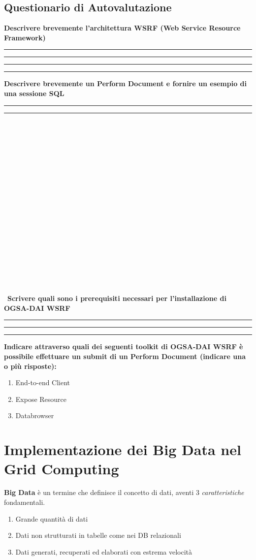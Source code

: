 \documentclass[11pt]{article}
\newcommand{\voceU}[1]{%
	\item #1\dotfill\Square%
}
\begin{document}
\subsection{Questionario di Autovalutazione}
\textbf{Descrivere brevemente l'architettura WSRF (Web Service Resource Framework)}\\[5ex]
\rule[5mm]{\textwidth}{0.1mm} 
\rule[5mm]{\textwidth}{0.1mm} 
\rule[5mm]{\textwidth}{0.1mm} 
\rule[5mm]{\textwidth}{0.1mm} 
\textbf{Descrivere brevemente un Perform Document e fornire un esempio di una sessione SQL}\\[5ex]
\rule[5mm]{\textwidth}{0.1mm} 
\rule[5mm]{\textwidth}{0.1mm} \\\\\\\\\\\\\\\\\\\\\\\\\\\\\\\\\\\\\
\textbf{Scrivere quali sono i prerequisiti necessari per l'installazione di OGSA-DAI WSRF}\\[5ex]
\rule[5mm]{\textwidth}{0.1mm} 
\rule[5mm]{\textwidth}{0.1mm} 
\rule[5mm]{\textwidth}{0.1mm} 
\textbf{Indicare attraverso quali dei seguenti toolkit di OGSA-DAI WSRF è possibile effettuare un submit di un Perform Document (indicare una o più risposte): }
\begin{enumerate}
	\voceU{End-to-end Client}
	\voceU{Expose Resource}
	\voceU{Databrowser}\\
\end{enumerate}
\newpage


\section{Implementazione dei Big Data nel Grid Computing}
\textbf{Big Data} è un termine che definisce il concetto di dati, aventi 3 \emph{caratteristiche} fondamentali. 
\begin{enumerate}
	\item Grande quantità di dati
	\item Dati non strutturati in tabelle come nei DB relazionali
	\item Dati generati, recuperati ed elaborati con estrema velocità
\end{enumerate}
\end{document}
